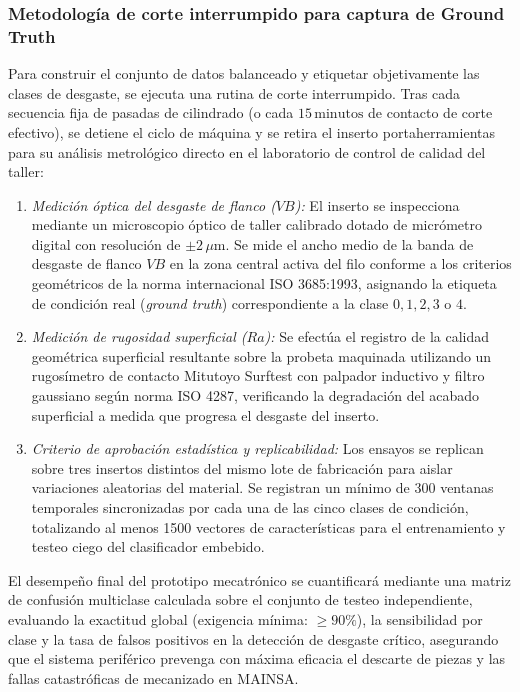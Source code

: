 \subsubsection{Metodología de corte interrumpido para captura de Ground Truth}
Para construir el conjunto de datos balanceado y etiquetar objetivamente las clases de desgaste, se ejecuta una rutina de corte interrumpido. Tras cada secuencia fija de pasadas de cilindrado (o cada $15\,\text{minutos}$ de contacto de corte efectivo), se detiene el ciclo de máquina y se retira el inserto portaherramientas para su análisis metrológico directo en el laboratorio de control de calidad del taller:

\begin{enumerate}
    \item \textit{Medición óptica del desgaste de flanco ($VB$):} El inserto se inspecciona mediante un microscopio óptico de taller calibrado dotado de micrómetro digital con resolución de $\pm 2\,\mu\text{m}$. Se mide el ancho medio de la banda de desgaste de flanco $VB$ en la zona central activa del filo conforme a los criterios geométricos de la norma internacional ISO 3685:1993, asignando la etiqueta de condición real (\textit{ground truth}) correspondiente a la clase $0, 1, 2, 3$ o $4$.
    \item \textit{Medición de rugosidad superficial ($Ra$):} Se efectúa el registro de la calidad geométrica superficial resultante sobre la probeta maquinada utilizando un rugosímetro de contacto Mitutoyo Surftest con palpador inductivo y filtro gaussiano según norma ISO 4287, verificando la degradación del acabado superficial a medida que progresa el desgaste del inserto.
    \item \textit{Criterio de aprobación estadística y replicabilidad:} Los ensayos se replican sobre tres insertos distintos del mismo lote de fabricación para aislar variaciones aleatorias del material. Se registran un mínimo de 300 ventanas temporales sincronizadas por cada una de las cinco clases de condición, totalizando al menos 1500 vectores de características para el entrenamiento y testeo ciego del clasificador embebido.
\end{enumerate}

El desempeño final del prototipo mecatrónico se cuantificará mediante una matriz de confusión multiclase calculada sobre el conjunto de testeo independiente, evaluando la exactitud global (exigencia mínima: $\ge 90\%$), la sensibilidad por clase y la tasa de falsos positivos en la detección de desgaste crítico, asegurando que el sistema periférico prevenga con máxima eficacia el descarte de piezas y las fallas catastróficas de mecanizado en MAINSA.
